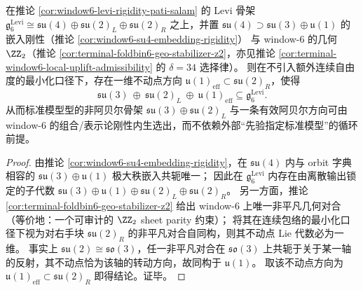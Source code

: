 \begin{corollary}\label{cor:window6-levi-rigidity-sm-residual}
在推论 \ref{cor:window6-levi-rigidity-pati-salam} 的 Levi 骨架
\(
\mathfrak g^{\mathrm{Levi}}_6\cong \mathfrak{su}(4)\oplus\mathfrak{su}(2)_L\oplus\mathfrak{su}(2)_R
\)
之上，并置 \(\mathfrak{su}(4)\supset \mathfrak{su}(3)\oplus\mathfrak u(1)\) 的嵌入刚性（推论 \ref{cor:window6-su4-embedding-rigidity}）
与 window-\(6\) 的几何 \(\ZZ_2\)（推论 \ref{cor:terminal-foldbin6-geo-stabilizer-z2}，亦见推论 \ref{cor:terminal-window6-local-uplift-admissibility} 的 \(\delta=34\) 选择律）。
则在不引入额外连续自由度的最小化口径下，存在一维不动点方向 \(\mathfrak u(1)_{\mathrm{eff}}\subset \mathfrak{su}(2)_R\)，使得
\[
\mathfrak{su}(3)\ \oplus\ \mathfrak{su}(2)_L\ \oplus\ \mathfrak u(1)_{\mathrm{eff}}
\subseteq \mathfrak g^{\mathrm{Levi}}_6.
\]
从而标准模型型的非阿贝尔骨架 \(\mathfrak{su}(3)\oplus\mathfrak{su}(2)_L\) 与一条有效阿贝尔方向可由 window-\(6\) 的组合/表示论刚性内生选出，而不依赖外部“先验指定标准模型”的循环前提。
\end{corollary}
\begin{proof}
由推论 \ref{cor:window6-su4-embedding-rigidity}，在 \(\mathfrak{su}(4)\) 内与 orbit 字典相容的 \(\mathfrak{su}(3)\oplus\mathfrak u(1)\) 极大秩嵌入共轭唯一；
因此在 \(\mathfrak g^{\mathrm{Levi}}_6\) 内存在由离散输出锁定的子代数
\(
\mathfrak{su}(3)\oplus\mathfrak u(1)\oplus\mathfrak{su}(2)_L\oplus\mathfrak{su}(2)_R
\)。
另一方面，推论 \ref{cor:terminal-foldbin6-geo-stabilizer-z2} 给出 window-\(6\) 上唯一非平凡几何对合（等价地：一个可审计的 \(\ZZ_2\) sheet parity 约束）；
将其在连续包络的最小化口径下视为对右手块 \(\mathfrak{su}(2)_R\) 的非平凡对合自同构，则其不动点 Lie 代数必为一维。
事实上 \(\mathfrak{su}(2)\cong\mathfrak{so}(3)\)，任一非平凡对合在 \(\mathfrak{so}(3)\) 上共轭于关于某一轴的反射，其不动点恰为该轴的转动方向，故同构于 \(\mathfrak u(1)\)。
取该不动点方向为 \(\mathfrak u(1)_{\mathrm{eff}}\subset \mathfrak{su}(2)_R\) 即得结论。证毕。
\end{proof}

